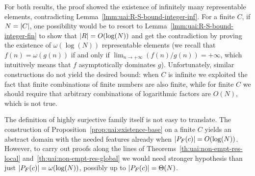 For both results, the proof showed the existence of infinitely many representable elements, contradicting Lemma~\ref{lmm:uai:R-S-bound-integer-inf}. For a finite $C$, if $N = \lvert C\rvert$, one possibility would be to resort to Lemma~\ref{lmm:uai:R-S-bound-integer-fin} to show that $\lvert R\rvert = O(\log(N))$ and get the contradiction by proving the existence of $\omega(\log(N))$ representable elements (we recall that $f(n) = \omega(g(n))$ if and only if $\lim_{n \rightarrow +\infty} \left( {f(n)} / {g(n)} \right) = +\infty$, which intuitively means that $f$ asymptotically dominates $g$). Unfortunately, similar constructions do not yield the desired bound: when $C$ is infinite we exploited the fact that finite combinations of finite numbers are also finite, while for finite $C$ we should require that arbitrary combinations of logarithmic factors are $O(N)$, which is not true.

The definition of highly surjective family itself is not easy to translate. The construction of Proposition~\ref{prop:uai:existence-base} on a finite $C$ yields an abstract domain with the needed features already when $\lvert P_F(c)\rvert = O(\log(N))$. However, to carry out proofs along the lines of Theorems~\ref{th:uai:non-empt-res-local} and~\ref{th:uai:non-empt-res-global} we would need stronger hypothesis than just $\lvert P_F(c)\rvert = \omega(\log(N))$, possibly up to $\lvert P_F(c)\rvert = \Theta(N)$.

